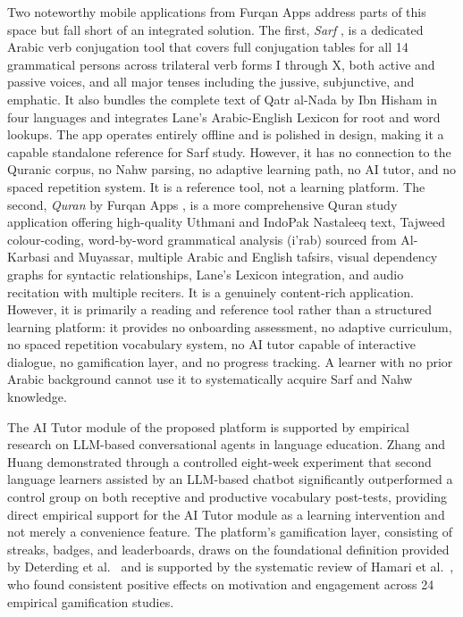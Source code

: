\documentclass[A4paper,12pt]{article}
\begin{document}
Two noteworthy mobile applications from Furqan Apps address parts of this space but fall short
of an integrated solution. The first, \textit{Sarf} \cite{furqan_sarf2026}, is a dedicated
Arabic verb conjugation tool that covers full conjugation tables for all 14 grammatical persons
across trilateral verb forms I through X, both active and passive voices, and all major tenses
including the jussive, subjunctive, and emphatic. It also bundles the complete text of Qatr
al-Nada by Ibn Hisham in four languages and integrates Lane's Arabic-English Lexicon for root
and word lookups. The app operates entirely offline and is polished in design, making it a
capable standalone reference for Sarf study. However, it has no connection to the Quranic
corpus, no Nahw parsing, no adaptive learning path, no AI tutor, and no spaced repetition system.
It is a reference tool, not a learning platform. The second, \textit{Quran} by Furqan Apps
\cite{furqan_quran2026}, is a more comprehensive Quran study application offering high-quality
Uthmani and IndoPak Nastaleeq text, Tajweed colour-coding, word-by-word grammatical analysis
(i'rab) sourced from Al-Karbasi and Muyassar, multiple Arabic and English tafsirs, visual
dependency graphs for syntactic relationships, Lane's Lexicon integration, and audio recitation
with multiple reciters. It is a genuinely content-rich application. However, it is primarily a
reading and reference tool rather than a structured learning platform: it provides no onboarding
assessment, no adaptive curriculum, no spaced repetition vocabulary system, no AI tutor capable
of interactive dialogue, no gamification layer, and no progress tracking. A learner with no
prior Arabic background cannot use it to systematically acquire Sarf and Nahw knowledge.

The AI Tutor module of the proposed platform is supported by empirical research on LLM-based
conversational agents in language education. Zhang and Huang \cite{zhang2024} demonstrated
through a controlled eight-week experiment that second language learners assisted by an LLM-based
chatbot significantly outperformed a control group on both receptive and productive vocabulary
post-tests, providing direct empirical support for the AI Tutor module as a learning intervention
and not merely a convenience feature. The platform's gamification layer, consisting of streaks,
badges, and leaderboards, draws on the foundational definition provided by
Deterding et al.\ \cite{deterding2011} and is supported by the systematic review of
Hamari et al.\ \cite{hamari2014}, who found consistent positive effects on motivation and
engagement across 24 empirical gamification studies.
\end{document}
